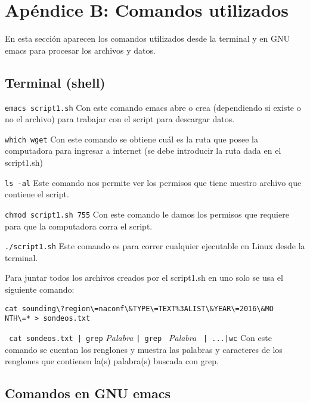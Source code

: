 \documentclass[12pt]{article}
\begin{document}
\section{Apéndice B: Comandos utilizados}
\label{apeb}
En esta sección aparecen los comandos utilizados desde la terminal y en GNU emacs para procesar los archivos y datos.

\subsection{Terminal (shell)}

\verb+emacs script1.sh+ \hspace{1 cm}Con este comando emacs abre o crea (dependiendo si existe o no el archivo) para trabajar con el script para descargar datos.

\verb+which wget+ \hspace{1 cm} Con este comando se obtiene cuál es la ruta que posee la computadora para ingresar a internet (se debe introducir la ruta dada en el script1.sh)

\verb+ls -al+ \hspace{1 cm} Este comando nos permite ver los permisos que tiene nuestro archivo que contiene el script.

\verb+chmod script1.sh 755+ \hspace{1 cm} Con este comando le damos los permisos que requiere para que la computadora corra el script.

\verb+./script1.sh+ \hspace{1 cm} Este comando es para correr cualquier ejecutable en Linux desde la terminal. 

\pagebreak

Para juntar todos los archivos creados por el script1.sh en uno solo se usa el siguiente comando:
\begin{verbatim}cat sounding\?region\=naconf\&TYPE\=TEXT%3ALIST\&YEAR\=2016\&MO
NTH\=* > sondeos.txt
\end{verbatim}

\verb+ cat sondeos.txt | grep+ \textit{Palabra} \verb+| grep + \textit{Palabra} \verb+ | ...|wc+ \hfill \break
Con este comando se cuentan los renglones y muestra las palabras y caracteres de los renglones que contienen la(s) palabra(s) buscada con grep.

\subsection{Comandos en GNU emacs}
\end{document}
